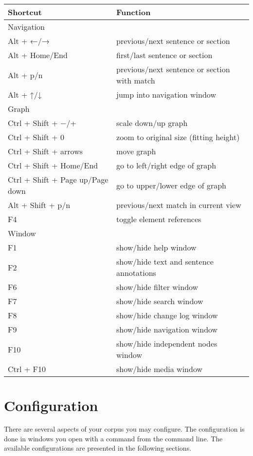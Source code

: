 \documentclass[12pt]{scrartcl}
\begin{document}
\begin{center}
	\begin{tabular*}{\textwidth}{ll}
		\toprule
		Shortcut & Function \\
		\midrule
		Navigation & \\
		\midrule
			Alt + ←/→ & previous/next sentence or section\\
			Alt + Home/End & first/last sentence or section \\
			Alt + p/n & previous/next sentence or section with match\\
			Alt + ↑/↓ & jump into navigation window\\
		\midrule
		Graph & \\
		\midrule
			Ctrl + Shift + −/+ & scale down/up graph\\
			Ctrl + Shift + 0 & zoom to original size (fitting height) \\
			Ctrl + Shift + arrows & move graph\\
			Ctrl + Shift + Home/End & go to left/right edge of graph\\
			Ctrl + Shift + Page up/Page down& go to upper/lower edge of graph\\
			Alt + Shift + p/n & previous/next match in current view\\
			F4 & toggle element references\\
		\midrule
		Window & \\
		\midrule
			F1 & show/hide help window \\
			F2 & show/hide text and sentence annotations\\
			F6 & show/hide filter window\\
			F7 & show/hide search window\\
			F8 & show/hide change log window\\
			F9 & show/hide navigation window\\
			F10 & show/hide independent nodes window\\
			Ctrl + F10 & show/hide media window\\
		\bottomrule
	\end{tabular*}
\end{center}



\section{Configuration}\label{konfiguration}

There are several aspects of your corpus you may configure. The configuration is done in windows you open with a command from the command line. The available configurations are presented in the following sections.
\end{document}
